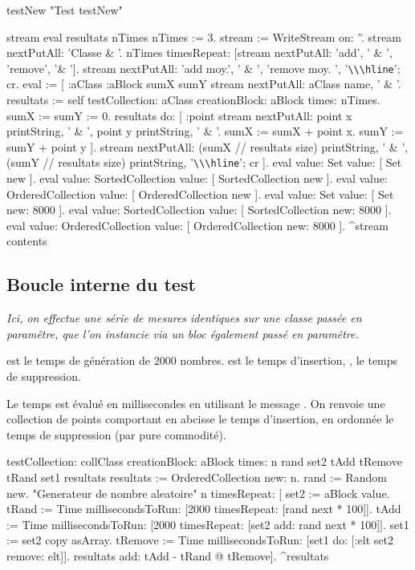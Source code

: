 \begin{scode}
testNew
   "Test testNew"

   \stBar stream eval resultats nTimes \stBar
   nTimes := 3.
   stream := WriteStream on: ''.
   stream nextPutAll: 'Classe \& '.
   nTimes timesRepeat: [stream nextPutAll: 'add', ' \& ', 'remove', '\& '].
   stream nextPutAll: 'add moy.', ' & ', 'remove moy. ', '\verb=\\\hline='; cr.
   eval := 
         [ :aClass :aBlock \stBar 
         \stBar sumX sumY \stBar
         stream nextPutAll: aClass name, ' \& '.
         resultats := self
                  testCollection: aClass
                  creationBlock: aBlock
                  times: nTimes.
         sumX := sumY := 0.
         resultats
            do: 
               [ :point \stBar 
               stream nextPutAll: point x printString, ' \& ', point y printString, ' \& '.
               sumX := sumX + point x.
               sumY := sumY + point y ].
         stream nextPutAll: (sumX // resultats size) printString, ' \& ', 
                            (sumY // resultats size) printString, '\verb=\\\hline='; cr ].
   eval value: Set value: [ Set new ].
   eval value: SortedCollection value: [ SortedCollection new ].
   eval value: OrderedCollection value: [ OrderedCollection new ].
   eval value: Set value: [ Set new: 8000 ].
   eval value: SortedCollection value: [ SortedCollection new: 8000 ].
   eval value: OrderedCollection value: [ OrderedCollection new: 8000 ].
   ^stream contents
\end{scode}


\subsection{Boucle interne du test}
{\em Ici, on effectue une s\'erie de mesures identiques sur une classe
pass\'ee en param\^etre, que l'on instancie via un bloc \'egalement pass\'e 
en param\^etre.

 est le temps de g\'en\'eration de 2000 nombres.  est le temps d'insertion, , le temps de suppression.

Le temps est \'evalu\'e en millisecondes en utilisant le message . On renvoie une collection de points comportant en abcisse le temps d'insertion, en ordonn\'ee le temps de suppression (par pure commodit\'e).}

\begin{scode}
testCollection: collClass creationBlock: aBlock times: n 
   \stBar rand set2 tAdd tRemove tRand set1 resultats \stBar
   resultats := OrderedCollection new: n.
   rand := Random new. "Generateur de nombre aleatoire"
   n
      timesRepeat: 
         [ set2 := aBlock value.
         tRand := Time millisecondsToRun: [2000 timesRepeat: [rand next * 100]].
         tAdd := Time millisecondsToRun: [2000 timesRepeat: [set2 add: rand next * 100]].
         set1 := set2 copy asArray.
         tRemove := Time millisecondsToRun: [set1 do: [:elt \stBar set2 remove: elt]].
         resultats add: tAdd - tRand @ tRemove].
   ^resultats
\end{scode}

